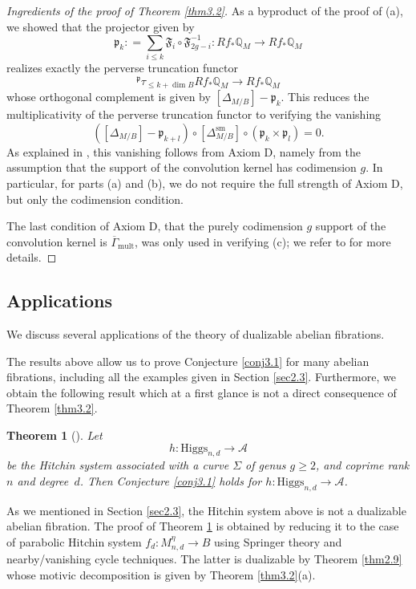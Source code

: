 \documentclass[11pt]{amsart}
\theoremstyle{plain}
\newtheorem{thm}{Theorem}[section]
\theoremstyle{definition}
\theoremstyle{remark}
\newcommand{\BQ}{{\mathbb{Q}}}
\newcommand{\CA}{{\mathcal A}}
\newcommand{\Fp}{{\mathfrak{p}}}
\begin{document}
\begin{proof}[Ingredients of the proof of Theorem \ref{thm3.2}]
As a byproduct of the proof of (a), we showed that the projector given by
\begin{equation}\label{P_cycle}
\mathfrak{p}_k: = \sum_{i\leq k}\mathfrak{F}_i\circ \mathfrak{F}^{-1}_{2g-i}: Rf_*\BQ_M \to Rf_* \BQ_M
\end{equation}
realizes exactly the perverse truncation functor
\[
{^\Fp}\tau_{\leq k + \dim B}Rf_{*}\BQ_{M} \to Rf_{*}\BQ_{M}
\]
whose orthogonal complement is given by $[\Delta_{M/B}] - \Fp_{k}$. This reduces the multiplicativity of the perverse truncation functor to verifying the vanishing
\[
 \left([\Delta_{M/B}] - \Fp_{k+l}\right) \circ [\Delta^{\mathrm{sm}}_{M/B}] \circ (\Fp_k \times \Fp_l)= 0.
\]
As explained in \cite[Section 2.5.3]{MSY}, this vanishing follows from Axiom D, namely from the assumption that the support of the convolution kernel has codimension $g$. In particular, for parts (a) and (b), we do not require the full strength of Axiom D, but only the codimension condition.

The last condition of Axiom D, that the purely codimension $g$ support of the convolution kernel is $\overline{\Gamma}_{\mathrm{mult}}$, was only used in verifying (c); we refer to \cite[Proof of Theorem 1.5]{BMSY2} for more details.
\end{proof}

\subsection{Applications}
We discuss several applications of the theory of dualizable abelian fibrations.
\medskip

 The results above allow us to prove Conjecture \ref{conj3.1} for many abelian fibrations, including all the examples given in Section \ref{sec2.3}. Furthermore, we obtain the following result which at a first glance is not a direct consequence of Theorem \ref{thm3.2}.

\begin{thm}[\cite{MSY2}]\label{thm3.5}
Let 
\[
h: \mathrm{Higgs}_{n,d} \to \CA
\]
be the Hitchin system associated with a curve $\Sigma$ of genus $g\geq 2$, and coprime rank $n$ and degree~$d$. Then Conjecture \ref{conj3.1} holds for $h: \mathrm{Higgs}_{n,d} \to \CA$.
\end{thm}

As we mentioned in Section \ref{sec2.3}, the Hitchin system above is not a dualizable abelian fibration. The proof of Theorem \ref{thm3.5} is obtained by reducing it to the case of parabolic Hitchin system $f_d: M^\eta_{n,d} \to B$ using Springer theory and nearby/vanishing cycle techniques. The latter is dualizable by Theorem \ref{thm2.9} whose motivic decomposition is given by Theorem \ref{thm3.2}(a).
\end{document}
